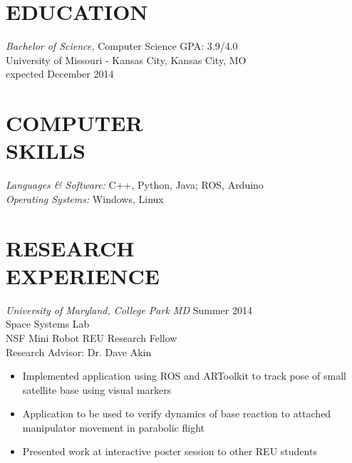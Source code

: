 \documentclass[line,margin]{res}
\begin{document}
\address{\hfill (913)235-1070 \textbar \textbar \hspace{1 mm}  victoria.chen.wu@gmail.com \textbar \textbar \hspace{1 mm} github.com/vptarmigan} 

 
\begin{resume}
 
\section{EDUCATION} {\sl Bachelor of Science,} Computer Science	\hfill GPA: 3.9/4.0\\
                University of Missouri - Kansas City, Kansas City, MO \\
                expected December 2014 
\section{COMPUTER \\ SKILLS} {\sl Languages \& Software:} 
		C++, Python, Java; ROS, Arduino \\
                {\sl Operating Systems:} Windows, Linux 
\section {RESEARCH \\ EXPERIENCE}
		{\sl University of Maryland, College Park MD}  \hfill  Summer 2014\\
		Space Systems Lab\\
		NSF Mini Robot REU Research Fellow \\
		Research Advisor: Dr. Dave Akin 
                 \begin{itemize}[leftmargin=5mm]  \itemsep -2pt %
		 \item Implemented application using ROS and ARToolkit to track pose of small satellite base using visual markers
		 \item Application to be used to verify dynamics of base reaction to attached manipulator movement in parabolic flight 
		 \item Presented work at interactive poster session to other REU students
         \end{itemize} 
		

\end{resume}
\end{document}
